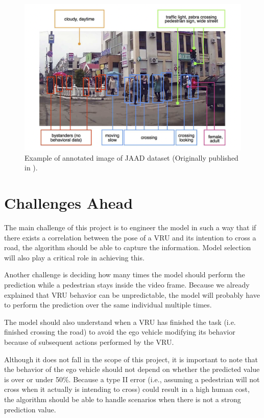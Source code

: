 \documentclass[journal,letterpaper]{IEEEtran}
\begin{document}
\begin{figure}[h]
  \centering
  \includegraphics[width=.75\columnwidth]{figures/jaad-dataset.png}
  \caption{Example of annotated image of JAAD dataset (Originally published in \cite{rasouli2017ICCVW}).}
  \label{fig:dataset:jaad}
\end{figure}
\section{Challenges Ahead}\label{sec:challenges}
The main challenge of this project is to engineer the model in such a way that if there exists a correlation between the pose of a VRU and its intention to cross a road, the algorithm should be able to capture the information. Model selection will also play a critical role in achieving this.

Another challenge is deciding how many times the model should perform the prediction while a pedestrian stays inside the video frame. Because we already explained that VRU behavior can be unpredictable, the model will probably have to perform the prediction over the same individual multiple times. 

The model should also understand when a VRU has finished the task (i.e. finished crossing the road) to avoid the ego vehicle modifying its behavior because of subsequent actions performed by the VRU. 

Although it does not fall in the scope of this project, it is important to note that the behavior of the ego vehicle should not depend on whether the predicted value is over or under 50\%. Because a type II error (i.e., assuming a pedestrian will not cross when it actually is intending to cross) could result in a high human cost, the algorithm should be able to handle scenarios when there is not a strong prediction value. 
\end{document}
